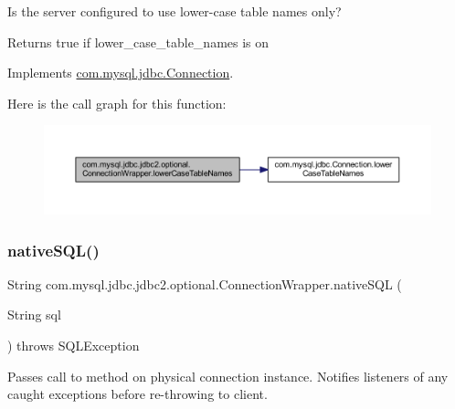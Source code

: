 Is the server configured to use lower-\/case table names only?

\begin{DoxyReturn}{Returns}
true if lower\+\_\+case\+\_\+table\+\_\+names is \textquotesingle{}on\textquotesingle{} 
\end{DoxyReturn}


Implements \mbox{\hyperlink{interfacecom_1_1mysql_1_1jdbc_1_1_connection_a18c9cf0dc2d7ca1f69a3435eb4dbfde2}{com.\+mysql.\+jdbc.\+Connection}}.

Here is the call graph for this function\+:
\nopagebreak
\begin{figure}[H]
\begin{center}
\leavevmode
\includegraphics[width=350pt]{classcom_1_1mysql_1_1jdbc_1_1jdbc2_1_1optional_1_1_connection_wrapper_a1c95dda9f599a78aef9acb5cf854b99b_cgraph}
\end{center}
\end{figure}
\mbox{\label{classcom_1_1mysql_1_1jdbc_1_1jdbc2_1_1optional_1_1_connection_wrapper_af2f01a1bf033b05483c9fae385306891}} 
\subsubsection{\texorpdfstring{native\+S\+Q\+L()}{nativeSQL()}}
{\footnotesize\ttfamily String com.\+mysql.\+jdbc.\+jdbc2.\+optional.\+Connection\+Wrapper.\+native\+S\+QL (\begin{DoxyParamCaption}\item[{String}]{sql }\end{DoxyParamCaption}) throws S\+Q\+L\+Exception}

Passes call to method on physical connection instance. Notifies listeners of any caught exceptions before re-\/throwing to client.

